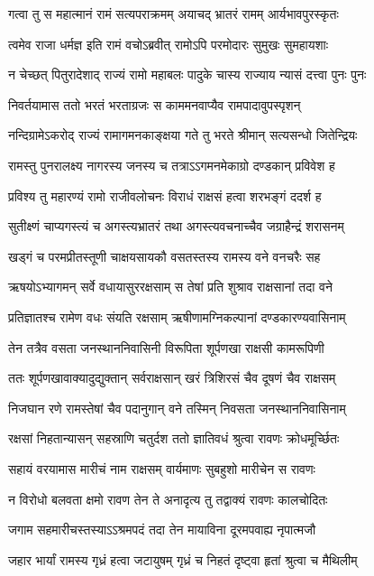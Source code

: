 \twolineshloka
{गत्वा तु स महात्मानं रामं सत्यपराक्रमम्}
{अयाचद् भ्रातरं रामम् आर्यभावपुरस्कृतः}%

\twolineshloka
{त्वमेव राजा धर्मज्ञ इति रामं वचोऽब्रवीत्}
{रामोऽपि परमोदारः सुमुखः सुमहायशाः}%

\twolineshloka
{न चेच्छत् पितुरादेशाद् राज्यं रामो महाबलः}
{पादुके चास्य राज्याय न्यासं दत्त्वा पुनः पुनः}%

\twolineshloka
{निवर्तयामास ततो भरतं भरताग्रजः}
{स काममनवाप्यैव रामपादावुपस्पृशन्}%

\twolineshloka
{नन्दिग्रामेऽकरोद् राज्यं रामागमनकाङ्क्षया}
{गते तु भरते श्रीमान् सत्यसन्धो जितेन्द्रियः}%

\twolineshloka
{रामस्तु पुनरालक्ष्य नागरस्य जनस्य च}
{तत्राऽऽगमनमेकाग्रो दण्डकान् प्रविवेश ह}%

\twolineshloka
{प्रविश्य तु महारण्यं रामो राजीवलोचनः}
{विराधं राक्षसं हत्वा शरभङ्गं ददर्श ह}%

\twolineshloka
{सुतीक्ष्णं चाप्यगस्त्यं च अगस्त्यभ्रातरं तथा}
{अगस्त्यवचनाच्चैव जग्राहैन्द्रं शरासनम्}%

\twolineshloka
{खड्गं च परमप्रीतस्तूणी चाक्षयसायकौ}
{वसतस्तस्य रामस्य वने वनचरैः सह}%

\twolineshloka
{ऋषयोऽभ्यागमन् सर्वे वधायासुररक्षसाम्}
{स तेषां प्रति शुश्राव राक्षसानां तदा वने}%

\twolineshloka
{प्रतिज्ञातश्च रामेण वधः संयति रक्षसाम्}
{ऋषीणामग्निकल्पानां दण्डकारण्यवासिनाम्}%

\twolineshloka
{तेन तत्रैव वसता जनस्थाननिवासिनी}
{विरूपिता शूर्पणखा राक्षसी कामरूपिणी}%

\twolineshloka
{ततः शूर्पणखावाक्यादुद्युक्तान् सर्वराक्षसान्}
{खरं त्रिशिरसं चैव दूषणं चैव राक्षसम्}%

\twolineshloka
{निजघान रणे रामस्तेषां चैव पदानुगान्}
{वने तस्मिन् निवसता जनस्थाननिवासिनाम्}%

\twolineshloka
{रक्षसां निहतान्यासन् सहस्राणि चतुर्दश}
{ततो ज्ञातिवधं श्रुत्वा रावणः क्रोधमूर्च्छितः}%

\twolineshloka
{सहायं वरयामास मारीचं नाम राक्षसम्}
{वार्यमाणः सुबहुशो मारीचेन स रावणः}%

\twolineshloka
{न विरोधो बलवता क्षमो रावण तेन ते}
{अनादृत्य तु तद्वाक्यं रावणः कालचोदितः}%

\twolineshloka
{जगाम सहमारीचस्तस्याऽऽश्रमपदं तदा}
{तेन मायाविना दूरमपवाह्य नृपात्मजौ}%

\twolineshloka
{जहार भार्यां रामस्य गृध्रं हत्वा जटायुषम्}
{गृध्रं च निहतं दृष्ट्वा हृतां श्रुत्वा च मैथिलीम्}%

